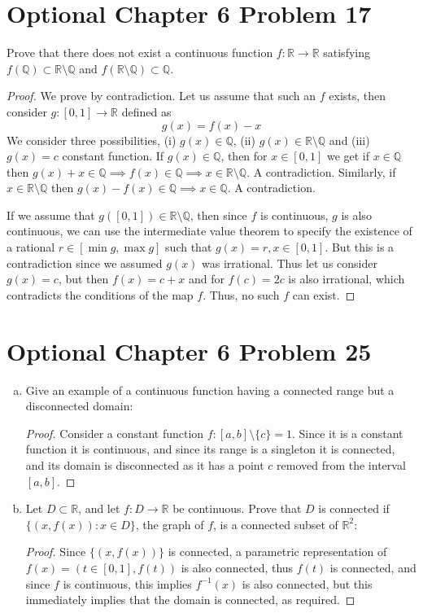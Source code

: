 \documentclass{article}
\newtheorem{proof}{Proof}
\def\to{\rightarrow}
\def\min{\operatorname{min}}
\def\max{\operatorname{max}}
\def\QQ{\mathbb Q}
\def\RR{\mathbb R}
\begin{document}
\section{Optional Chapter 6 Problem 17}
Prove that there does not exist a continuous function
$f:\RR \to \RR$ satisfying $f(\QQ)\subset \RR\setminus\QQ$ and
$f(\RR\setminus\QQ) \subset \QQ$.
\begin{proof}
We prove by contradiction. Let us assume that such an $f$ exists, then
consider $g:[0,1]\to\RR$ defined as
\[
g(x) = f(x)-x
\]
We consider three possibilities, (i) $g(x)\in \QQ$, (ii) $g(x)\in\RR\setminus\QQ$
and (iii) $g(x)=c$ constant function. If $g(x)\in\QQ$, then for $x\in[0,1]$
we get if $x\in\QQ$ then $g(x)+x\in\QQ\implies f(x)\in\QQ\implies x\in\RR\setminus \QQ$.
A contradiction. Similarly, if $x\in\RR\setminus\QQ$ then $g(x)-f(x)\in\QQ\implies x\in\QQ$.
A contradiction.

If we assume that $g([0,1])\in\RR\setminus\QQ$, then since $f$ is continuous, 
$g$ is also continuous, we can use the intermediate value theorem to
specify the existence of a rational $r\in[\min g,\max g]$ such that $g(x)=r,x\in[0,1]$.
But this is a contradiction since we assumed $g(x)$ was irrational. Thus let us
consider $g(x)=c$, but then $f(x)=c+x$ and for $f(c)=2c$ is also irrational, which
contradicts the conditions of the map $f$. Thus, no such $f$ can exist.
\end{proof}

\section{Optional Chapter 6 Problem 25}
\begin{enumerate}[(a)]
\item{Give an example of a continuous function having a
connected range but a disconnected domain}:
\begin{proof}
Consider a constant function $f:[a,b]\setminus\{c\}=1$. Since it is a constant
function it is continuous, and since its range is a singleton it is
connected, and its domain is disconnected as it has a point $c$
removed from the interval $[a,b]$.
\end{proof}

\item{Let $D\subset \RR$, and let $f:D\to\RR$ be continuous. Prove
that $D$ is connected if $\{(x,f(x)):x\in D\}$, the graph of $f$,
is a connected subset of $\RR^2$}:
\begin{proof}
Since $\{(x,f(x))\}$ is connected, a parametric representation of
$f(x)=(t\in[0,1],f(t))$ is also connected, thus $f(t)$ is connected, and since
$f$ is continuous, this implies $f^{-1}(x)$ is also connected, but 
this immediately implies that the domain is connected, as required.
\end{proof}

\end{enumerate}
\end{document}
